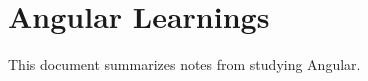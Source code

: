 \documentclass{article}
\begin{document}
\section*{Angular Learnings}
This document summarizes notes from studying Angular.
\end{document}

